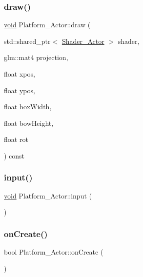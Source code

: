\subsubsection{\texorpdfstring{draw()}{draw()}}
{\footnotesize\ttfamily \hyperlink{imgui__impl__opengl3__loader_8h_ac668e7cffd9e2e9cfee428b9b2f34fa7}{void} Platform\+\_\+\+Actor\+::draw (\begin{DoxyParamCaption}\item[{std\+::shared\+\_\+ptr$<$ \hyperlink{classShader__Actor}{Shader\+\_\+\+Actor} $>$}]{shader,  }\item[{glm\+::mat4}]{projection,  }\item[{float}]{xpos,  }\item[{float}]{ypos,  }\item[{float}]{box\+Width,  }\item[{float}]{bow\+Height,  }\item[{float}]{rot }\end{DoxyParamCaption}) const}

\mbox{\label{classPlatform__Actor_a368a0206078f8b44e67386bc6fc47b6c}} 
\subsubsection{\texorpdfstring{input()}{input()}}
{\footnotesize\ttfamily \hyperlink{imgui__impl__opengl3__loader_8h_ac668e7cffd9e2e9cfee428b9b2f34fa7}{void} Platform\+\_\+\+Actor\+::input (\begin{DoxyParamCaption}{ }\end{DoxyParamCaption})}

\mbox{\label{classPlatform__Actor_ab902e2540f1d3127dedff632841b4921}} 
\subsubsection{\texorpdfstring{on\+Create()}{onCreate()}}
{\footnotesize\ttfamily bool Platform\+\_\+\+Actor\+::on\+Create (\begin{DoxyParamCaption}{ }\end{DoxyParamCaption})\hspace{0.3cm}{\ttfamily [virtual]}}



